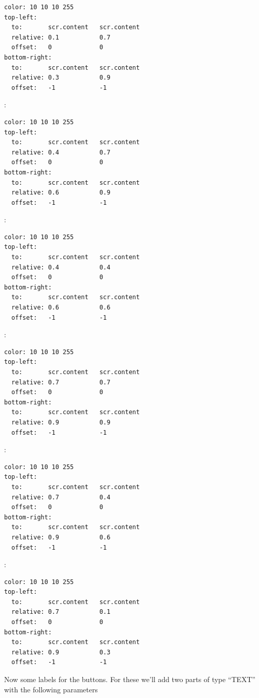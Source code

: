 \documentclass[a4paper]{profusion}
\begin{document}
\begin{description}
\begin{verbatim}
color: 10 10 10 255
top-left:
  to:       scr.content   scr.content
  relative: 0.1           0.7
  offset:   0             0
bottom-right:
  to:       scr.content   scr.content
  relative: 0.3           0.9
  offset:   -1            -1
\end{verbatim}
\item[``marker2'']:
\begin{verbatim}
color: 10 10 10 255
top-left:
  to:       scr.content   scr.content
  relative: 0.4           0.7
  offset:   0             0
bottom-right:
  to:       scr.content   scr.content
  relative: 0.6           0.9
  offset:   -1            -1
\end{verbatim}
\item[``marker3'']:
\begin{verbatim}
color: 10 10 10 255
top-left:
  to:       scr.content   scr.content
  relative: 0.4           0.4
  offset:   0             0
bottom-right:
  to:       scr.content   scr.content
  relative: 0.6           0.6
  offset:   -1            -1
\end{verbatim}
\item[``marker4'']:
\begin{verbatim}
color: 10 10 10 255
top-left:
  to:       scr.content   scr.content
  relative: 0.7           0.7
  offset:   0             0
bottom-right:
  to:       scr.content   scr.content
  relative: 0.9           0.9
  offset:   -1            -1
\end{verbatim}
\item[``marker5'']:
\begin{verbatim}
color: 10 10 10 255
top-left:
  to:       scr.content   scr.content
  relative: 0.7           0.4
  offset:   0             0
bottom-right:
  to:       scr.content   scr.content
  relative: 0.9           0.6
  offset:   -1            -1
\end{verbatim}
\item[``marker6'']:
\begin{verbatim}
color: 10 10 10 255
top-left:
  to:       scr.content   scr.content
  relative: 0.7           0.1
  offset:   0             0
bottom-right:
  to:       scr.content   scr.content
  relative: 0.9           0.3
  offset:   -1            -1
\end{verbatim}
\end{description}

Now some labels for the buttons. For these we'll add two parts of type
``TEXT'' with the following parameters
\end{document}
